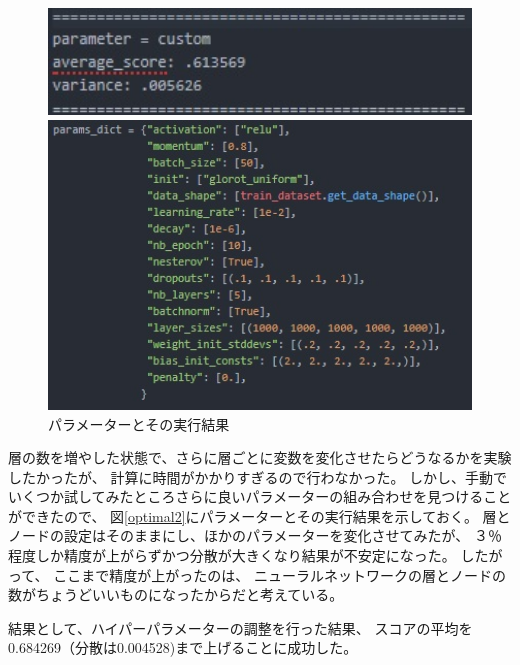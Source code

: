 \documentclass[a4j,11pt]{jarticle}
\begin{document}
\begin{figure}
	\begin{minipage}{0.50\hsize}
		\begin{center}
			\includegraphics[width=12cm, bb=0 0 292 74]{optimal1.jpg}
		\end{center}
	\end{minipage}
	\begin{minipage}{0.50\hsize}
		\begin{center}
			\includegraphics[width=12cm, bb=0 0 411 281]{optimal1p.jpg}
		\end{center}
	\end{minipage}
	\caption{パラメーターとその実行結果}
	\label{fig2}
\end{figure}



層の数を増やした状態で、さらに層ごとに変数を変化させたらどうなるかを実験したかったが、
計算に時間がかかりすぎるので行わなかった。
しかし、手動でいくつか試してみたところさらに良いパラメーターの組み合わせを見つけることができたので、
図\ref{optimal2}にパラメーターとその実行結果を示しておく。
層とノードの設定はそのままにし、ほかのパラメーターを変化させてみたが、
３％程度しか精度が上がらずかつ分散が大きくなり結果が不安定になった。
したがって、
ここまで精度が上がったのは、
ニューラルネットワークの層とノードの数がちょうどいいものになったからだと考えている。

結果として、ハイパーパラメーターの調整を行った結果、
スコアの平均を0.684269（分散は0.004528)まで上げることに成功した。
\end{document}
